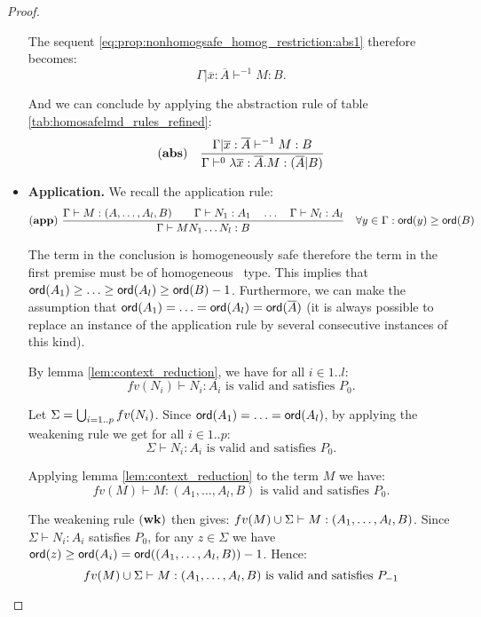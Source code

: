 \begin{proof}
\begin{itemize}
The sequent \ref{eq:prop:nonhomogsafe_homog_restriction:abs1} therefore becomes:
$$\Gamma | \overline{x} : \overline{A} \vdash^{-1} M : B.$$

And we can conclude by applying the abstraction rule of table \ref{tab:homosafelmd_rules_refined}:
$$ \mathbf{(abs)} \quad  \frac{\displaystyle \Gamma| \overline{x} : \overline{A} \vdash^{-1} M : B}{\Gamma  \vdash^{0} \lambda \overline{x} : \overline{A} . M : (\overline{A}|B)}$$



\item \textbf{Application.} We recall the application rule:
$$ \mathbf{(app)} \  \frac{\displaystyle \Gamma \vdash M : (A,\ldots,A_l,B)
                                        \qquad \Gamma \vdash N_1 : A_1
                                        \quad \ldots \quad \Gamma \vdash N_l : A_l  }{\Gamma  \vdash M N_1 \ldots N_l : B}
                                    \quad
                                   \forall y \in \Gamma : {\sf ord}(y) \geq {\sf ord}(B)$$

The term in the conclusion is homogeneously safe therefore the term in the first premise must be of homogeneous \
type. This implies that ${\sf ord}(A_1) \geq \ldots \geq {\sf ord}(A_l)
\geq {\sf ord}(B) - 1$.
Furthermore, we can make the assumption that ${\sf ord}(A_1) = \ldots = {\sf ord}(A_l) = {\sf ord}(\overline{A})$
(it is always possible to replace an instance of the application rule
by several consecutive instances of this kind).

By lemma \ref{lem:context_reduction}, we have for all $i \in 1..l$:
$$fv(N_i) \vdash N_i : A_i \mbox{ is valid and satisfies } P_0.$$

Let $\Sigma = \bigcup_{i=1..p} fv(N_i)$. Since ${\sf ord}(A_1) = \ldots = {\sf ord}(A_l)$, by applying the weakening rule we get for all $i\in 1..p$:
$$\Sigma \vdash N_i : A_i \mbox{ is valid and satisfies } P_0.$$


Applying lemma \ref{lem:context_reduction} to the term $M$ we have:
$$fv(M) \vdash M : (A_1,\ldots,A_l,B) \mbox{ is valid and satisfies } P_0.$$

The weakening rule $\mathbf{(wk)}$ then gives:
$fv(M) \cup \Sigma \vdash M : (A_1,\ldots,A_l,B)$.
Since $\Sigma \vdash N_i : A_i$ satisfies $P_0$, for any
$z \in \Sigma$ we have ${\sf ord}(z) \geq {\sf ord}(A_i) = {\sf ord}((A_1,\ldots,A_l,B)) - 1$.
Hence:
\begin{equation}
fv(M) \cup \Sigma \vdash M : (A_1,\ldots,A_l,B) \mbox{ is valid and satisfies } P_{-1} \label{eq:prop:nonhomogsafe_homog_restriction:m}
\end{equation}


\end{itemize}
\end{proof}
